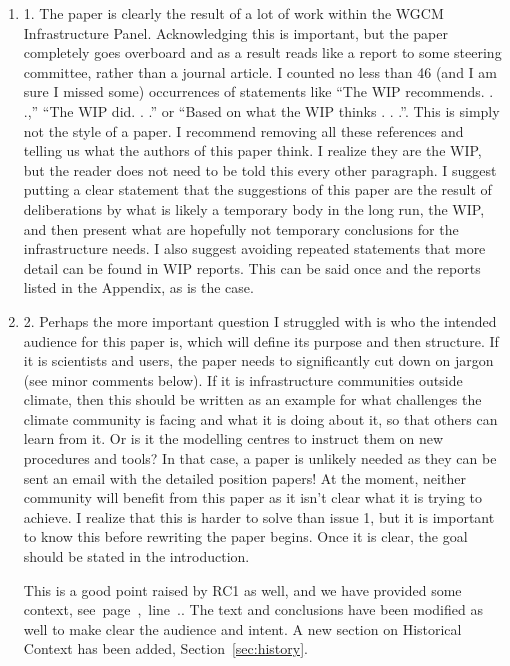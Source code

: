 \documentclass[gmd,manuscript]{copernicus}
\newcommand{\plref}[1]{\mbox{see page \pageref{p-#1}, line
    \lineref{l-#1}.}}
\newenvironment{answer}{\color{blue}}{}
\begin{document}
\begin{enumerate}[label=RC3-\arabic*,leftmargin=*]
\item 1. The paper is clearly the result of a lot of work within the
  WGCM Infrastructure Panel. Acknowledging this is important, but the
  paper completely goes overboard and as a result reads like a report
  to some steering committee, rather than a journal article. I counted
  no less than 46 (and I am sure I missed some) occurrences of
  statements like “The WIP recommends. . .,” “The WIP did. . .” or
  “Based on what the WIP thinks . . .”. This is simply not the style
  of a paper. I recommend removing all these references and telling us
  what the authors of this paper think. I realize they are the WIP,
  but the reader does not need to be told this every other paragraph.
  I suggest putting a clear statement that the suggestions of this
  paper are the result of deliberations by what is likely a temporary
  body in the long run, the WIP, and then present what are hopefully
  not temporary conclusions for the infrastructure needs. I also
  suggest avoiding repeated statements that more detail can be found
  in WIP reports. This can be said once and the reports listed in the
  Appendix, as is the case.
\item 2. Perhaps the more important question I struggled with is who the
  intended audience for this paper is, which will define its purpose
  and then structure. If it is scientists and users, the paper needs
  to significantly cut down on jargon (see minor comments below). If
  it is infrastructure communities outside climate, then this should
  be written as an example for what challenges the climate community
  is facing and what it is doing about it, so that others can learn
  from it. Or is it the modelling centres to instruct them on new
  procedures and tools? In that case, a paper is unlikely needed as
  they can be sent an email with the detailed position papers! At the
  moment, neither community will benefit from this paper as it isn’t
  clear what it is trying to achieve. I realize that this is harder to
  solve than issue 1, but it is important to know this before
  rewriting the paper begins. Once it is clear, the goal should be
  stated in the introduction.

  \begin{answer}
    This is a good point raised by RC1 as well, and we have provided
    some context, \plref{RC1-Overview-1}. The text and conclusions
    have been modified as well to make clear the audience and intent.
    A new section on Historical Context has been added,
    Section~\ref{sec:history}.
  \end{answer}


\end{enumerate}
\end{document}
